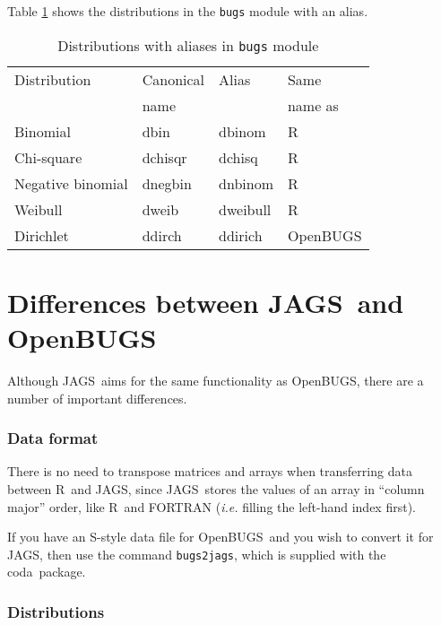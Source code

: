 \documentclass[11pt, a4paper, titlepage]{report}
\newcommand{\JAGS}{\textsf{JAGS}}
\newcommand{\OpenBUGS}{\textsf{OpenBUGS}}
\newcommand{\R}{\textsf{R}}
\newcommand{\CODA}{\textsf{coda}}
\begin{document}
Table \ref{table:bugs:distributions:alias} shows the distributions in
the \texttt{bugs} module with an alias.

\begin{table}
\begin{center}
\begin{tabular}{llll}
\hline
Distribution & Canonical & Alias & Same \\
             & name      &       & name as \\
\hline
Binomial           & dbin      & dbinom   & R   \\
Chi-square         & dchisqr   & dchisq   & R   \\ 
Negative binomial  & dnegbin   & dnbinom  & R   \\
Weibull            & dweib     & dweibull & R   \\ 
Dirichlet          & ddirch    & ddirich  & OpenBUGS \\
\hline
\end{tabular}
\caption{Distributions with aliases in \texttt{bugs} module
  \label{table:bugs:distributions:alias}}
\end{center}
\end{table}

\chapter{Differences between \JAGS\ and \OpenBUGS}

Although \JAGS\ aims for the same functionality as \OpenBUGS, there are
a number of important differences.

\subsection{Data format}

There is no need to transpose matrices and arrays when transferring
data between \R\ and \JAGS, since \JAGS\ stores the values of an array
in ``column major'' order, like \R\ and FORTRAN ({\em i.e.} filling
the left-hand index first).

If you have an \textsf{S}-style data file for \OpenBUGS\ and you wish
to convert it for \JAGS, then use the command \texttt{bugs2jags},
which is supplied with the \CODA\ package.

\subsection{Distributions}
\end{document}
